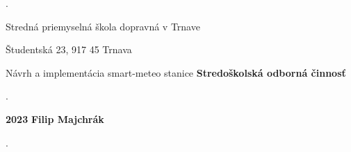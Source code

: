 \begin{titlepage}
    \phantom.
    
    \begin{center}
    {\sc\LARGE Stredná priemyselná škola dopravná v Trnave}
    \medskip
   
    {\sc\large Študentská 23, 917 45 Trnava}
    \break
    \end {center}
    \vspace{6.5cm}
    
    
    \begin{center}
    {\sc\LARGE Návrh a implementácia smart-meteo stanice}
    \break
    {\sc\LARGE\bf Stredoškolská odborná činnosť}
    
    \medskip
    \end{center}
    
    
    
    \vspace{5cm}
    
    
    
    \phantom.\hfill
    
    \vfill
    \sc\large \textbf{2023} \hfill\sc\large\textbf{Filip Majchrák}
    
    \phantom.
    \end{titlepage}